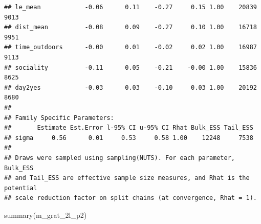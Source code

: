 \documentclass[
]{article}
\newenvironment{Shaded}{\begin{snugshade}}{\end{snugshade}}
\newcommand{\FunctionTok}[1]{\textcolor[rgb]{0.00,0.00,0.00}{#1}}
\newcommand{\NormalTok}[1]{#1}
\begin{document}
\begin{verbatim}
## le_mean            -0.06      0.11    -0.27     0.15 1.00    20839     9013
## dist_mean          -0.08      0.09    -0.27     0.10 1.00    16718     9951
## time_outdoors      -0.00      0.01    -0.02     0.02 1.00    16987     9113
## sociality          -0.11      0.05    -0.21    -0.00 1.00    15836     8625
## day2yes            -0.03      0.03    -0.10     0.03 1.00    20192     8680
## 
## Family Specific Parameters: 
##       Estimate Est.Error l-95% CI u-95% CI Rhat Bulk_ESS Tail_ESS
## sigma     0.56      0.01     0.53     0.58 1.00    12248     7538
## 
## Draws were sampled using sampling(NUTS). For each parameter, Bulk_ESS
## and Tail_ESS are effective sample size measures, and Rhat is the potential
## scale reduction factor on split chains (at convergence, Rhat = 1).
\end{verbatim}

\begin{Shaded}
\begin{Highlighting}[]
\FunctionTok{summary}\NormalTok{(m\_grat\_2l\_p2)}
\end{Highlighting}
\end{Shaded}
\end{document}
